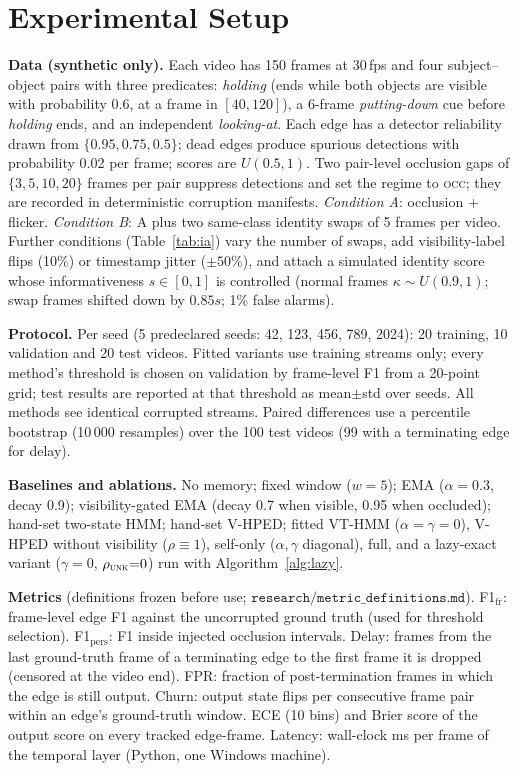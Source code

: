 \documentclass[conference]{IEEEtran}
\newcommand{\OCC}{\textsc{occ}}
\newcommand{\UNK}{\textsc{unk}}
\begin{document}
\section{Experimental Setup}
\textbf{Data (synthetic only).} Each video has 150 frames at 30\,fps and four
subject--object pairs with three predicates: \emph{holding} (ends while both objects are
visible with probability 0.6, at a frame in $[40,120]$), a 6-frame \emph{putting-down}
cue before \emph{holding} ends, and an independent \emph{looking-at}. Each edge has a
detector reliability drawn from $\{0.95,0.75,0.5\}$; dead edges produce spurious
detections with probability 0.02 per frame; scores are $U(0.5,1)$. Two pair-level
occlusion gaps of $\{3,5,10,20\}$ frames per pair suppress detections and set the
regime to \OCC; they are recorded in deterministic corruption manifests.
\emph{Condition A}: occlusion + flicker. \emph{Condition B}: A plus two same-class
identity swaps of 5 frames per video. Further conditions (Table~\ref{tab:ia}) vary
the number of swaps, add visibility-label flips (10\%) or timestamp jitter ($\pm50\%$),
and attach a simulated identity score whose informativeness $s\in[0,1]$ is controlled
(normal frames $\kappa\sim U(0.9,1)$; swap frames shifted down by $0.85s$; 1\% false
alarms).

\textbf{Protocol.} Per seed (5 predeclared seeds: 42, 123, 456, 789, 2024): 20 training,
10 validation and 20 test videos. Fitted variants use training streams only; every
method's threshold is chosen on validation by frame-level F1 from a 20-point grid; test
results are reported at that threshold as mean$\pm$std over seeds. All methods see
identical corrupted streams. Paired differences use a percentile bootstrap (10\,000
resamples) over the 100 test videos (99 with a terminating edge for delay).

\textbf{Baselines and ablations.} No memory; fixed window ($w{=}5$); EMA
($\alpha{=}0.3$, decay 0.9); visibility-gated EMA (decay 0.7 when visible, 0.95 when
occluded); hand-set two-state HMM; hand-set V-HPED; fitted VT-HMM ($\alpha{=}\gamma{=}0$),
V-HPED without visibility ($\rho\equiv1$), self-only ($\alpha,\gamma$ diagonal), full, and
a lazy-exact variant ($\gamma{=}0$, $\rho_{\UNK}{=}0$) run with Algorithm~\ref{alg:lazy}.

\textbf{Metrics} (definitions frozen before use; $\texttt{research/metric\_definitions.md}$).
F1$_{\mathrm{fr}}$: frame-level edge F1 against the uncorrupted ground truth (used for
threshold selection). F1$_{\mathrm{pers}}$: F1 inside injected occlusion intervals.
Delay: frames from the last ground-truth frame of a terminating edge to the first frame
it is dropped (censored at the video end). FPR: fraction of post-termination frames in
which the edge is still output. Churn: output state flips per consecutive frame pair
within an edge's ground-truth window. ECE (10 bins) and Brier score of the output score
on every tracked edge-frame. Latency: wall-clock ms per frame of the temporal layer
(Python, one Windows machine).
\end{document}

